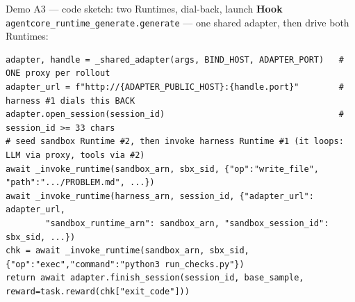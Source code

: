 \documentclass[aspectratio=169]{beamer}
\begin{document}
\begin{frame}[fragile]{Demo A3 --- code sketch: two Runtimes, dial-back, launch}
  \footnotesize\textbf{Hook} \texttt{agentcore\_runtime\_generate.generate} --- one shared adapter, then drive both Runtimes:
\begin{lstlisting}[basicstyle=\ttfamily\scriptsize]
adapter, handle = _shared_adapter(args, BIND_HOST, ADAPTER_PORT)   # ONE proxy per rollout
adapter_url = f"http://{ADAPTER_PUBLIC_HOST}:{handle.port}"        # harness #1 dials this BACK
adapter.open_session(session_id)                                   # session_id >= 33 chars
# seed sandbox Runtime #2, then invoke harness Runtime #1 (it loops: LLM via proxy, tools via #2)
await _invoke_runtime(sandbox_arn, sbx_sid, {"op":"write_file", "path":".../PROBLEM.md", ...})
await _invoke_runtime(harness_arn, session_id, {"adapter_url": adapter_url,
        "sandbox_runtime_arn": sandbox_arn, "sandbox_session_id": sbx_sid, ...})
chk = await _invoke_runtime(sandbox_arn, sbx_sid, {"op":"exec","command":"python3 run_checks.py"})
return await adapter.finish_session(session_id, base_sample, reward=task.reward(chk["exit_code"]))
\end{lstlisting}
\end{frame}
\end{document}

